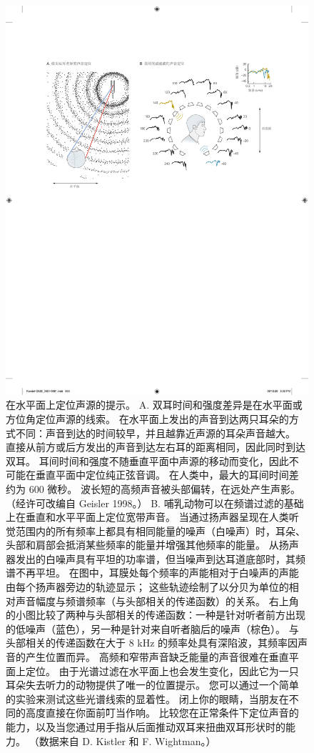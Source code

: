 \begin{figure}[htbp]
	\centering
	\includegraphics[width=1.0\linewidth]{chap28/fig_28_1}
	\caption{在水平面上定位声源的提示。
	A. 双耳时间和强度差异是在水平面或方位角定位声源的线索。
	在水平面上发出的声音到达两只耳朵的方式不同：声音到达的时间较早，并且越靠近声源的耳朵声音越大。
	直接从前方或后方发出的声音到达左右耳的距离相同，因此同时到达双耳。
	耳间时间和强度不随垂直平面中声源的移动而变化，因此不可能在垂直平面中定位纯正弦音调。
	在人类中，最大的耳间时间差约为 600 微秒。
	波长短的高频声音被头部偏转，在远处产生声影。 （经许可改编自 Geisler 1998。）
	B. 哺乳动物可以在频谱过滤的基础上在垂直和水平平面上定位宽带声音。
	当通过扬声器呈现在人类听觉范围内的所有频率上都具有相同能量的噪声（白噪声）时，耳朵、头部和肩部会抵消某些频率的能量并增强其他频率的能量。
	从扬声器发出的白噪声具有平坦的功率谱，但当噪声到达耳道底部时，其频谱不再平坦。
	在图中，耳膜处每个频率的声能相对于白噪声的声能由每个扬声器旁边的轨迹显示； 
	这些轨迹绘制了以分贝为单位的相对声音幅度与频谱频率（与头部相关的传递函数）的关系。
	右上角的小图比较了两种与头部相关的传递函数：一种是针对听者前方出现的低噪声（蓝色），另一种是针对来自听者脑后的噪声（棕色）。
	与头部相关的传递函数在大于 8 kHz 的频率处具有深陷波，其频率因声音的产生位置而异。
	高频和窄带声音缺乏能量的声音很难在垂直平面上定位。
	由于光谱过滤在水平面上也会发生变化，因此它为一只耳朵失去听力的动物提供了唯一的位置提示。
	您可以通过一个简单的实验来测试这些光谱线索的显着性。
	闭上你的眼睛，当朋友在不同的高度直接在你面前叮当作响。
	比较您在正常条件下定位声音的能力，以及当您通过用手指从后面推动双耳来扭曲双耳形状时的能力。 （数据来自 D. Kistler 和 F. Wightman。）}
	\label{fig:28_1}
\end{figure}


